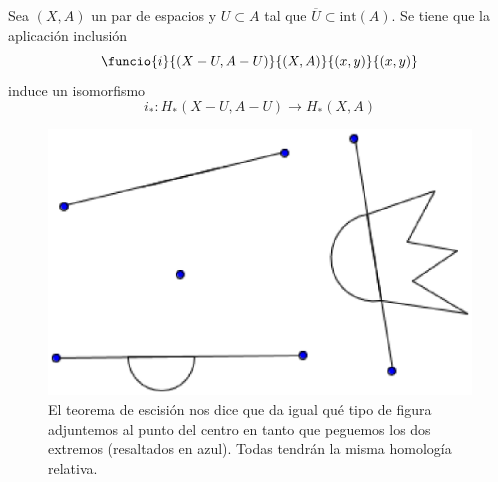 \begin{teo}
Sea $(X,A)$ un par de espacios y $U \subset A$ tal que $\overline{U} \subset \mbox{int}(A)$. Se tiene que la aplicación inclusión \[\funcio{i}{(X-U,A-U)}{(X,A)}{(x,y)}{(x,y)}\] induce un isomorfismo $$i_*: H_*(X-U,A-U) \longrightarrow H_*(X,A)$$
\end{teo}

\begin{figure}[h]
\centering
\includegraphics[scale=0.7]{Figures/TeoEsci}
\caption{El teorema de escisión nos dice que da igual qué tipo de figura adjuntemos al punto del centro en tanto que peguemos los dos extremos (resaltados en azul). Todas tendrán la misma homología relativa.}
\end{figure}

